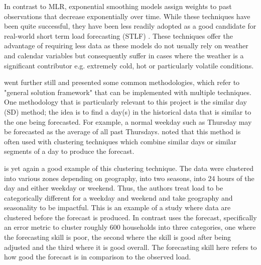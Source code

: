In contrast to MLR, exponential smoothing models assign weights to past observations that decrease exponentially over time. While these techniques have been quite successful, they have been less readily adopted as a good candidate for real-world short term load forecasting (STLF) \citep{hong16}. These techniques offer the advantage of requiring less data as these models do not usually rely on weather and calendar variables but consequently suffer in cases where the weather is a significant contributor e.g. extremely cold, hot or particularly volatile conditions.

\citet{hong16} went further still and presented some common methodologies, which refer to "general solution framework" that can be implemented with multiple techniques. One methodology that is particularly relevant to this project is the similar day (SD) method; the idea is to find a day(s) in the historical data that is similar to the one being forecasted. For example, a normal weekday such as Thursday may be forecasted as the average of all past Thursdays. \citet{hong16} noted that this method is often used with clustering techniques which combine similar days or similar segments of a day to produce the forecast.

\citet{char14} is yet again a good example of this clustering technique. The data were clustered into various zones depending on geography, into two seasons, into 24 hours of the day and either weekday or weekend. Thus, the authors treat load to be categorically different for a weekday and weekend and take geography and seasonality to be impactful. This is an example of a study where data are clustered before the forecast is produced. In contrast \cite{dan14} uses the forecast, specifically an error metric to cluster roughly 600 households into three categories, one where the forecasting skill is poor, the second where the skill is good after being adjusted and the third where it is good overall. The forecasting skill here refers to how good the forecast is in comparison to the observed load.

